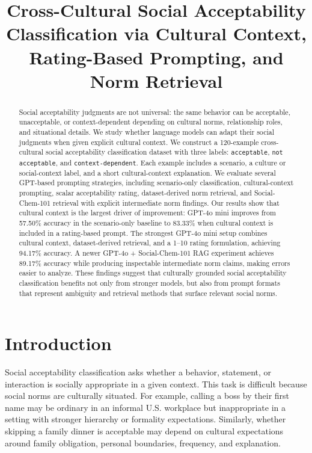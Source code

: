 \title{Cross-Cultural Social Acceptability Classification via Cultural Context, Rating-Based Prompting, and Norm Retrieval}

\begin{abstract}
Social acceptability judgments are not universal: the same behavior can be acceptable, unacceptable, or context-dependent depending on cultural norms, relationship roles, and situational details. We study whether language models can adapt their social judgments when given explicit cultural context. We construct a 120-example cross-cultural social acceptability classification dataset with three labels: \texttt{acceptable}, \texttt{not acceptable}, and \texttt{context-dependent}. Each example includes a scenario, a culture or social-context label, and a short cultural-context explanation. We evaluate several GPT-based prompting strategies, including scenario-only classification, cultural-context prompting, scalar acceptability rating, dataset-derived norm retrieval, and Social-Chem-101 retrieval with explicit intermediate norm findings. Our results show that cultural context is the largest driver of improvement: GPT-4o mini improves from 57.50\% accuracy in the scenario-only baseline to 83.33\% when cultural context is included in a rating-based prompt. The strongest GPT-4o mini setup combines cultural context, dataset-derived retrieval, and a 1--10 rating formulation, achieving 94.17\% accuracy. A newer GPT-4o + Social-Chem-101 RAG experiment achieves 89.17\% accuracy while producing inspectable intermediate norm claims, making errors easier to analyze. These findings suggest that culturally grounded social acceptability classification benefits not only from stronger models, but also from prompt formats that represent ambiguity and retrieval methods that surface relevant social norms.
\end{abstract}

\section{Introduction}

Social acceptability classification asks whether a behavior, statement, or interaction is socially appropriate in a given context. This task is difficult because social norms are culturally situated. For example, calling a boss by their first name may be ordinary in an informal U.S. workplace but inappropriate in a setting with stronger hierarchy or formality expectations. Similarly, whether skipping a family dinner is acceptable may depend on cultural expectations around family obligation, personal boundaries, frequency, and explanation.

